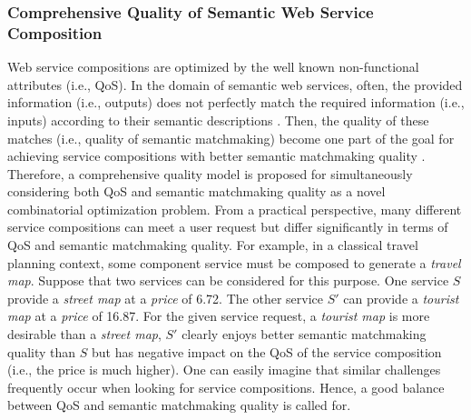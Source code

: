 \subsubsection{Comprehensive Quality of Semantic Web Service Composition}\label{SC:hybridisation}
Web service compositions are optimized by the well known non-functional attributes (i.e., QoS). In the domain of semantic web services, often, the provided information (i.e., outputs) does not perfectly match the required information (i.e., inputs) according to their semantic descriptions \cite{lecue2008optimizing}. Then, the quality of these matches (i.e., quality of semantic matchmaking) become one part of the goal for achieving service compositions with better semantic matchmaking quality \cite{lecue2009optimizing}. Therefore, a comprehensive quality model is proposed for simultaneously considering both QoS and semantic matchmaking quality as a novel combinatorial optimization problem. From a practical perspective, many different service compositions can meet a user request but differ significantly in terms of QoS and semantic matchmaking quality. For example, in a classical travel planning context, some component service must be composed to generate a \emph{travel map}. Suppose that two services can be considered for this purpose. One service $S$ provide a \emph{street map} at a \emph{price} of 6.72. The other service $S'$ can provide a \emph{tourist map} at a \emph{price} of 16.87. For the given service request, a \emph{tourist map} is more desirable than a \emph{street map}, $S'$ clearly enjoys better semantic matchmaking quality than $S$ but has negative impact on the QoS of the service composition (i.e., the price is much higher). One can easily imagine that similar challenges frequently occur when looking for service compositions. Hence, a good balance between QoS and semantic matchmaking quality is called for.

